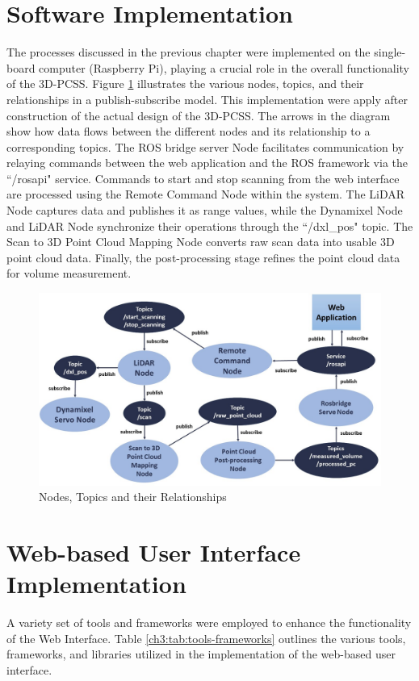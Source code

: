 \section{Software Implementation}

The processes discussed in the previous chapter were implemented on the single-board computer (Raspberry Pi), playing a crucial role in the overall functionality of the 3D-PCSS. Figure \ref{ch4:fig:nodes-topics-relationships} illustrates the various nodes, topics, and their relationships in a publish-subscribe model. This implementation were apply after construction of the actual design of the 3D-PCSS. The arrows in the diagram show how data flows between the different nodes and its relationship to a corresponding topics. The ROS bridge server Node facilitates communication by relaying commands between the web application and the ROS framework via the ``/rosapi" service. Commands to start and stop scanning from the web interface are processed using the Remote Command Node within the system. The LiDAR Node captures data and publishes it as range values, while the Dynamixel Node and LiDAR Node synchronize their operations through the ``/dxl\_pos" topic. The Scan to 3D Point Cloud Mapping Node converts raw scan data into usable 3D point cloud data. Finally, the post-processing stage refines the point cloud data for volume measurement.

\begin{figure}[H]
	\centering
	\includegraphics[width=1\textwidth]{Figures/nodes-topics-relationship}
	\caption{Nodes, Topics and their Relationships}
	\label{ch4:fig:nodes-topics-relationships}
\end{figure}

\section{Web-based User Interface Implementation}
A variety set of tools and frameworks were employed to enhance the functionality of the Web Interface. Table \ref{ch3:tab:tools-frameworks} outlines the various tools, frameworks, and libraries utilized in the implementation of the web-based user interface.

